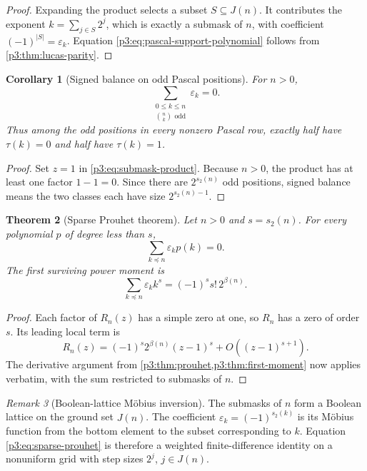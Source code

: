 \documentclass[11pt,oneside]{article}
\newtheorem{theorem}{Theorem}[section]
\newtheorem{corollary}[theorem]{Corollary}
\theoremstyle{definition}
\theoremstyle{remark}
\newtheorem{remark}[theorem]{Remark}
\newcommand{\swt}{s_2}
\newcommand{\eps}{\varepsilon}
\newcommand{\submask}{\preccurlyeq}
\newcommand{\1}{\mathbf 1}
\begin{document}
\begin{proof}
Expanding the product selects a subset \(S\subseteq J(n)\).  It contributes the exponent
\(k=\sum_{j\in S}2^j\), which is exactly a submask of \(n\), with coefficient
\((-1)^{|S|}=\eps_k\).  Equation \eqref{p3:eq:pascal-support-polynomial} follows from
\cref{p3:thm:lucas-parity}.
\end{proof}

\begin{corollary}[Signed balance on odd Pascal positions]
\label{p3:cor:pascal-balance}
For \(n>0\),
\begin{equation}
 \boxed{
 \sum_{\substack{0\le k\le n\\ \binom nk\text{ odd}}}\eps_k=0.}
 \label{p3:eq:pascal-balance}
\end{equation}
Thus among the odd positions in every nonzero Pascal row, exactly half have \(\tau(k)=0\) and
half have \(\tau(k)=1\).
\end{corollary}

\begin{proof}
Set \(z=1\) in \eqref{p3:eq:submask-product}.  Because \(n>0\), the product has at least one
factor \(1-1=0\).  Since there are \(2^{\swt(n)}\) odd positions, signed balance means the two
classes each have size \(2^{\swt(n)-1}\).
\end{proof}

\begin{theorem}[Sparse Prouhet theorem]
\label{p3:thm:sparse-prouhet}
Let \(n>0\) and \(s=\swt(n)\).  For every polynomial \(p\) of degree less than \(s\),
\begin{equation}
 \boxed{
 \sum_{k\submask n}\eps_kp(k)=0.}
 \label{p3:eq:sparse-prouhet}
\end{equation}
The first surviving power moment is
\begin{equation}
 \boxed{
 \sum_{k\submask n}\eps_kk^s=(-1)^s s!\,2^{\beta(n)}.}
 \label{p3:eq:sparse-first-moment}
\end{equation}
\end{theorem}

\begin{proof}
Each factor of \(R_n(z)\) has a simple zero at one, so \(R_n\) has a zero of order
\(s\).  Its leading local term is
\[
 R_n(z)=(-1)^s2^{\beta(n)}(z-1)^s+O((z-1)^{s+1}).
\]
The derivative argument from \cref{p3:thm:prouhet,p3:thm:first-moment} now applies verbatim, with
the sum restricted to submasks of \(n\).
\end{proof}

\begin{remark}[Boolean-lattice Möbius inversion]
The submasks of \(n\) form a Boolean lattice on the ground set \(J(n)\).  The coefficient
\(\eps_k=(-1)^{\swt(k)}\) is its Möbius function from the bottom element to the subset
corresponding to \(k\).  Equation \eqref{p3:eq:sparse-prouhet} is therefore a weighted
finite-difference identity on a nonuniform grid with step sizes \(2^j\), \(j\in J(n)\).
\end{remark}
\end{document}
